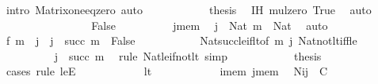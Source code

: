 \begin{isabellebody}
\ {\isacharparenleft}{\kern0pt}intro\ Matrix{\isacharunderscore}{\kern0pt}one{\isacharunderscore}{\kern0pt}eq{\isacharunderscore}{\kern0pt}zero{\isacharparenright}{\kern0pt}\ auto\isanewline
\ \ \ \ \ \ \ \ \isamarkupfalse%
\ \isamarkupfalse%
\ {\isacharquery}{\kern0pt}thesis\ \isamarkupfalse%
\ IH\ mul{\isacharunderscore}{\kern0pt}zero\ True\ \isamarkupfalse%
\ auto\isanewline
\ \ \ \ \ \ \isamarkupfalse%
\isanewline
\ \ \ \ \ \ \ \ \isamarkupfalse%
\ False\isanewline
\ \ \ \ \ \ \ \ \isamarkupfalse%
\ j{\isacharunderscore}{\kern0pt}mem\ \isamarkupfalse%
\ {\isachardoublequoteopen}j\ {\isacharcolon}{\kern0pt}\ Nat{\isachardoublequoteclose}\ {\isachardoublequoteopen}m\ {\isacharcolon}{\kern0pt}\ Nat{\isachardoublequoteclose}\ \isamarkupfalse%
\ auto\isanewline
\ \ \ \ \ \ \ \ \isamarkupfalse%
\ \isamarkupfalse%
\ f{\isacharcolon}{\kern0pt}\ {\isachardoublequoteopen}m\ {\isacharless}{\kern0pt}\ j\ {\isasymand}\ j\ {\isacharless}{\kern0pt}\ succ\ m\ {\isasymLongrightarrow}\ False{\isachardoublequoteclose}\ \isamarkupfalse%
\isanewline
\ \ \ \ \ \ \ \ \ \ Nat{\isacharunderscore}{\kern0pt}succ{\isacharunderscore}{\kern0pt}le{\isacharunderscore}{\kern0pt}if{\isacharunderscore}{\kern0pt}lt{\isacharbrackleft}{\kern0pt}of\ m\ j{\isacharbrackright}{\kern0pt}\ Nat{\isacharunderscore}{\kern0pt}not{\isacharunderscore}{\kern0pt}lt{\isacharunderscore}{\kern0pt}iff{\isacharunderscore}{\kern0pt}le\ \isamarkupfalse%
\isanewline
\ \ \ \ \ \ \ \ \isamarkupfalse%
\ {\isachardoublequoteopen}j\ {\isasymle}\ succ\ m{\isachardoublequoteclose}\ \isamarkupfalse%
\ {\isacharparenleft}{\kern0pt}rule\ Nat{\isacharunderscore}{\kern0pt}le{\isacharunderscore}{\kern0pt}if{\isacharunderscore}{\kern0pt}not{\isacharunderscore}{\kern0pt}lt{\isacharparenright}{\kern0pt}\ simp\isanewline
\ \ \ \ \ \ \ \ \isamarkupfalse%
\ \isamarkupfalse%
\ {\isacharquery}{\kern0pt}thesis\isanewline
\ \ \ \ \ \ \ \ \isamarkupfalse%
\ {\isacharparenleft}{\kern0pt}cases\ rule{\isacharcolon}{\kern0pt}\ leE{\isacharparenright}{\kern0pt}\isanewline
\ \ \ \ \ \ \ \ \ \ \isamarkupfalse%
\ lt\isanewline
\ \ \ \ \ \ \ \ \ \ \isamarkupfalse%
\ i{\isacharunderscore}{\kern0pt}mem\ j{\isacharunderscore}{\kern0pt}mem\ \isamarkupfalse%
\ {\isachardoublequoteopen}N{\isacharbackquote}{\kern0pt}i{\isacharbackquote}{\kern0pt}j\ {\isacharcolon}{\kern0pt}\ C{\isachardoublequoteclose}\ \isamarkupfalse%

\end{isabellebody}
